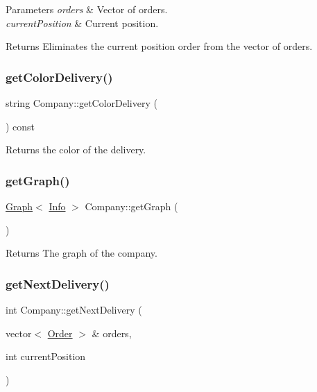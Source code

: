 \begin{DoxyParams}{Parameters}
{\em orders} & Vector of orders. \\
\hline
{\em current\+Position} & Current position.\\
\hline
\end{DoxyParams}
\begin{DoxyReturn}{Returns}
Eliminates the current position order from the vector of orders. 
\end{DoxyReturn}
\mbox{\label{class_company_a101cd0004c4ae653257ec2ece1adc2d4}} 
\subsubsection{\texorpdfstring{get\+Color\+Delivery()}{getColorDelivery()}}
{\footnotesize\ttfamily string Company\+::get\+Color\+Delivery (\begin{DoxyParamCaption}{ }\end{DoxyParamCaption}) const}

\begin{DoxyReturn}{Returns}
the color of the delivery. 
\end{DoxyReturn}
\mbox{\label{class_company_aa54486b77c4b2bd8ca101bc8a2795e81}} 
\subsubsection{\texorpdfstring{get\+Graph()}{getGraph()}}
{\footnotesize\ttfamily \hyperlink{class_graph}{Graph}$<$ \hyperlink{class_info}{Info} $>$ Company\+::get\+Graph (\begin{DoxyParamCaption}{ }\end{DoxyParamCaption})}

\begin{DoxyReturn}{Returns}
The graph of the company. 
\end{DoxyReturn}
\mbox{\label{class_company_a59aed26c4a06ccdaeb86daf6029e8455}} 
\subsubsection{\texorpdfstring{get\+Next\+Delivery()}{getNextDelivery()}}
{\footnotesize\ttfamily int Company\+::get\+Next\+Delivery (\begin{DoxyParamCaption}\item[{vector$<$ \hyperlink{class_order}{Order} $>$ \&}]{orders,  }\item[{int}]{current\+Position }\end{DoxyParamCaption})}


